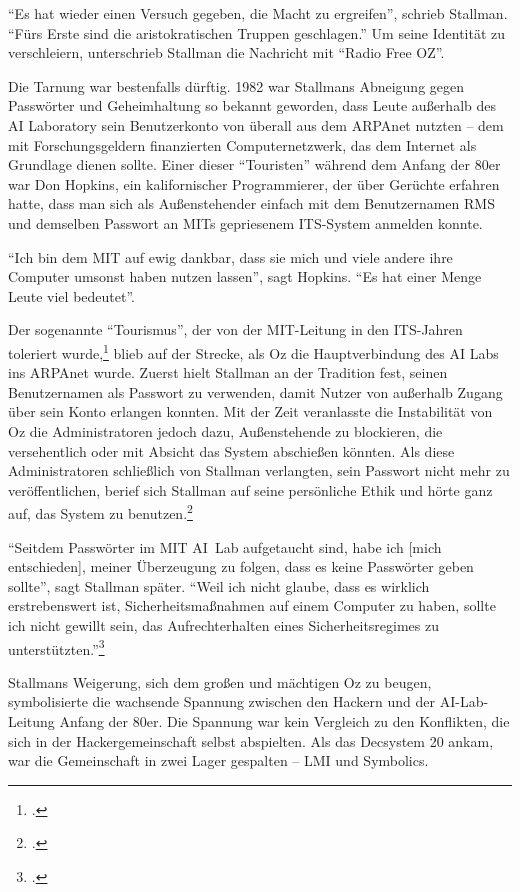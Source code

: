 "`Es hat wieder einen Versuch gegeben, die Macht zu ergreifen"', schrieb Stallman. "`Fürs Erste sind die aristokratischen Truppen geschlagen."' Um seine Identität zu verschleiern, unterschrieb Stallman die Nachricht mit "`Radio Free OZ"'.

Die Tarnung war bestenfalls dürftig. 1982 war Stallmans Abneigung gegen Passwörter und Geheimhaltung so bekannt geworden, dass Leute außerhalb des AI Laboratory sein Benutzerkonto von überall aus dem ARPAnet nutzten – dem mit Forschungsgeldern finanzierten Computernetzwerk, das dem Internet als Grundlage dienen sollte. Einer dieser "`Touristen"' während dem Anfang der 80er war Don Hopkins, ein kalifornischer Programmierer, der über Gerüchte erfahren hatte, dass man sich als Außenstehender einfach mit dem Benutzernamen RMS und demselben Passwort an MITs gepriesenem ITS-System anmelden konnte.

"`Ich bin dem MIT auf ewig dankbar, dass sie mich und viele andere ihre Computer umsonst haben nutzen lassen"', sagt Hopkins. "`Es hat einer Menge Leute viel bedeutet"'.

Der sogenannte "`Tourismus"', der von der MIT-Leitung in den ITS-Jahren toleriert wurde,\footcite{mittour} blieb auf der Strecke, als Oz die Hauptverbindung des AI Labs ins ARPAnet wurde. Zuerst hielt Stallman an der Tradition fest, seinen Benutzernamen als Passwort zu verwenden, damit Nutzer von außerhalb Zugang über sein Konto erlangen konnten. Mit der Zeit veranlasste die Instabilität von Oz die Administratoren jedoch dazu, Außenstehende zu blockieren, die versehentlich oder mit Absicht das System abschießen könnten. Als diese Administratoren schließlich von Stallman verlangten, sein Passwort nicht mehr zu veröffentlichen, berief sich Stallman auf seine persönliche Ethik und hörte ganz auf, das System zu benutzen.\footcite[Vgl.][]{rmskth}

"`Seitdem Passwörter im MIT AI~Lab aufgetaucht sind, habe ich [mich entschieden], meiner Überzeugung zu folgen, dass es keine Passwörter geben sollte"', sagt Stallman später. "`Weil ich nicht glaube, dass es wirklich erstrebenswert ist, Sicherheitsmaßnahmen auf einem Computer zu haben, sollte ich nicht gewillt sein, das Aufrechterhalten eines Sicherheitsregimes zu unterstützten."'\footcite{rmskth}

Stallmans Weigerung, sich dem großen und mächtigen Oz zu beugen, symbolisierte die wachsende Spannung zwischen den Hackern und der AI-Lab-Leitung Anfang der 80er. Die Spannung war kein Vergleich zu den Konflikten, die sich in der Hackergemeinschaft selbst abspielten. Als das Decsystem 20 ankam, war die Gemeinschaft in zwei Lager gespalten – LMI und Symbolics.

